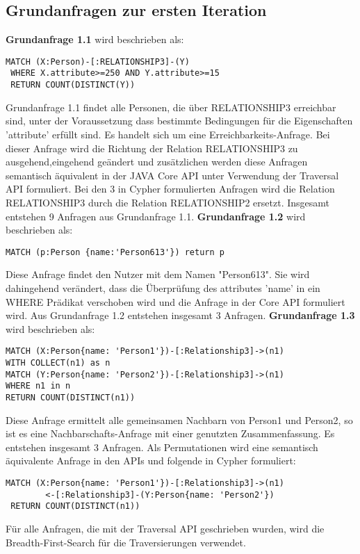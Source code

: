 \subsection{Grundanfragen zur ersten Iteration}
\textbf{Grundanfrage 1.1} wird beschrieben als:
\begin{Verbatim}[frame=single]
 MATCH (X:Person)-[:RELATIONSHIP3]-(Y) 
 WHERE X.attribute>=250 AND Y.attribute>=15  
 RETURN COUNT(DISTINCT(Y))
\end{Verbatim} 
Grundanfrage 1.1 findet alle Personen, die über RELATIONSHIP3 erreichbar sind, unter der Voraussetzung dass bestimmte Bedingungen für die Eigenschaften 'attribute' erfüllt sind. Es handelt sich um eine Erreichbarkeits-Anfrage. Bei dieser Anfrage wird die Richtung der Relation RELATIONSHIP3 zu ausgehend,eingehend  geändert und zusätzlichen werden diese Anfragen  semantisch äquivalent in der JAVA Core API unter Verwendung der Traversal API formuliert. Bei den 3 in Cypher formulierten Anfragen wird die Relation RELATIONSHIP3 durch die Relation RELATIONSHIP2 ersetzt. Insgesamt entstehen 9 Anfragen aus Grundanfrage 1.1. \newline 
\textbf{Grundanfrage 1.2} wird beschrieben als: 
\begin{Verbatim}[frame=single]
MATCH (p:Person {name:'Person613'}) return p
\end{Verbatim} 
Diese Anfrage findet den Nutzer mit dem Namen "Person613". Sie wird dahingehend verändert, dass die Überprüfung des attributes 'name' in ein WHERE Prädikat verschoben wird und die Anfrage  in der Core API formuliert wird. Aus Grundanfrage 1.2 entstehen insgesamt 3 Anfragen.\newline 
\textbf{Grundanfrage 1.3} wird beschrieben als: 
\begin{Verbatim}[frame=single]
MATCH (X:Person{name: 'Person1'})-[:Relationship3]->(n1) 
WITH COLLECT(n1) as n 
MATCH (Y:Person{name: 'Person2'})-[:Relationship3]->(n1) 
WHERE n1 in n
RETURN COUNT(DISTINCT(n1))
\end{Verbatim} 
Diese Anfrage ermittelt alle gemeinsamen Nachbarn von Person1 und Person2, so ist es eine Nachbarschafts-Anfrage mit einer genutzten Zusammenfassung. Es entstehen insgesamt 3 Anfragen. Als Permutationen wird eine semantisch äquivalente Anfrage in den APIs und folgende in Cypher formuliert:
\begin{Verbatim}[frame=single]
 MATCH (X:Person{name: 'Person1'})-[:Relationship3]->(n1)
 		<-[:Relationship3]-(Y:Person{name: 'Person2'}) 
 RETURN COUNT(DISTINCT(n1))
\end{Verbatim} 
Für alle Anfragen, die mit der Traversal API geschrieben wurden, wird die Breadth-First-Search für die Traversierungen verwendet. 
